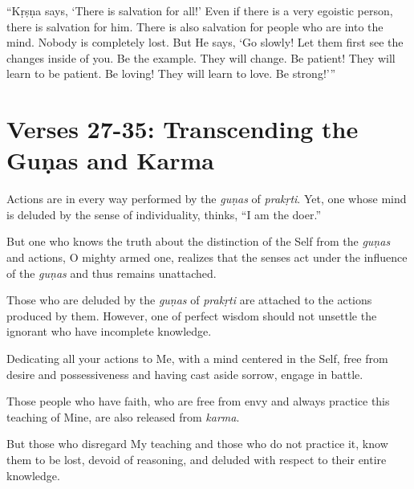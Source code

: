 \enquote{Kṛṣṇa says, \enquote{There is salvation for all!} Even if there is a very egoistic person, there is salvation for him. There is also salvation for people who are into the mind. Nobody is completely lost. But He says, \enquote{Go slowly! Let them first see the changes inside of you. Be the example. They will change. Be patient! They will learn to be patient. Be loving! They will learn to love. Be strong!}}

\newpage
\section{Verses 27-35: Transcending the Guṇas and Karma}\label{sec-verses-27-35-transcending-the-gunas-and-karma}
{Actions are in every way performed by the \textit{guṇas} of \textit{prakṛti}. Yet, one whose mind is deluded by the sense of individuality, thinks, \enquote{I am the doer.}}

{But one who knows the truth about the distinction of the Self from the \textit{guṇas} and actions, O mighty armed one, realizes that the senses act under the influence of the \textit{guṇas} and thus remains unattached.}

{Those who are deluded by the \textit{guṇas} of \textit{prakṛti} are attached to the actions produced by them. However, one of perfect wisdom should not unsettle the ignorant who have incomplete knowledge.}

{Dedicating all your actions to Me, with a mind centered in the Self, free from desire and possessiveness and having cast aside sorrow, engage in battle.}

{Those people who have faith, who are free from envy and always practice this teaching of Mine, are also released from \textit{karma}.}

{But those who disregard My teaching and those who do not practice it, know them to be lost, devoid of reasoning, and deluded with respect to their entire knowledge.}

